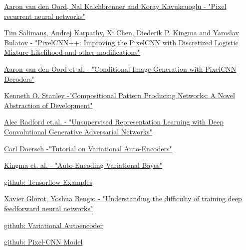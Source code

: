 \documentclass[journal]{IEEEtran}
\begin{document}
\begin{thebibliography}{1}
\href{https://arxiv.org/pdf/1601.06759.pdf}{Aaron van den Oord, Nal Kalchbrenner and Koray Kavukcuoglu - "Pixel recurrent neural networks"}

\href{https://arxiv.org/pdf/1701.05517.pdf}{Tim Salimans, Andrej Karpathy, Xi Chen, Diederik P. Kingma and Yaroslav Bulatov - "PixelCNN++:  Improving the PixelCNN with Discretized Logistic Mixture Likelihood and other modifications"}

\href{https://arxiv.org/pdf/1606.05328.pdf}{Aaron van den Oord et al. - "Conditional Image Generation with PixelCNN Decoders"}

\href{http://eplex.cs.ucf.edu/papers/stanley_gpem07.pdf}{Kenneth O. Stanley -"Compositional Pattern Producing Networks: A Novel Abstraction of Development"}

\href{https://arxiv.org/abs/1511.06434}{Alec Radford et.al. - "Unsupervised Representation Learning with Deep Convolutional Generative Adversarial Networks"}

\href{https://arxiv.org/abs/1606.05908}{Carl Doersch -"Tutorial on Variational Auto-Encoders"}

\href{https://arxiv.org/abs/1312.6114}{Kingma et. al. - "Auto-Encoding Variational Bayes"}

\href{https://github.com/aymericdamien/TensorFlow-Examples/blob/master/examples/3_NeuralNetworks/convolutional_network.py}{github: Tensorflow-Examples}

\href{http://proceedings.mlr.press/v9/glorot10a/glorot10a.pdf}{Xavier Glorot, Yoshua Bengio - "Understanding the difficulty of training deep feedforward neural networks"}


\href{https://github.com/bluebelmont/Variational-Autoencoder}{github: Variational Autoencoder}

\href{https://github.com/openai/pixel-cnn}{github: Pixel-CNN Model}


\end{thebibliography}
\end{document}
